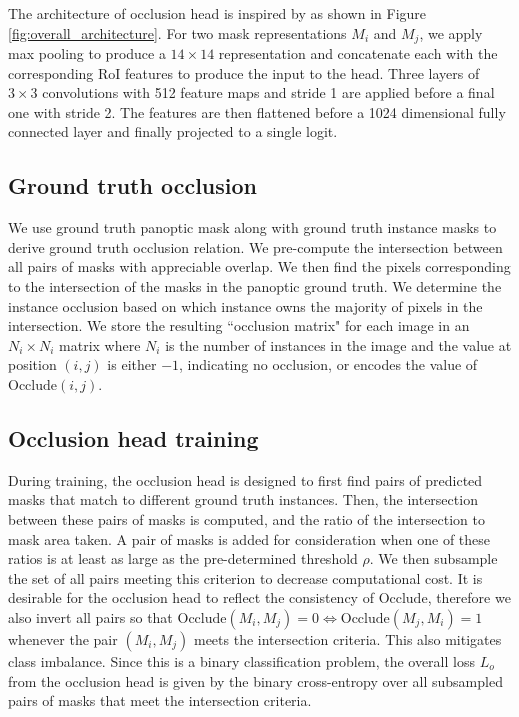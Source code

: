 \documentclass[10pt,twocolumn,letterpaper]{article}
\begin{document}
The architecture of occlusion head is inspired by \cite{huang2019mask} as shown in Figure \ref{fig:overall_architecture}. For two mask representations $M_i$ and $M_j$, we apply max pooling to produce a $14 \times 14$ representation and concatenate each with the corresponding RoI features to produce the input to the head. Three layers of $3 \times 3$ convolutions with 512 feature maps and stride 1 are applied before a final one with stride 2. The features are then flattened before a 1024 dimensional fully connected layer and finally projected to a single logit.


\subsection{Ground truth occlusion} \label{sec:gt_occlusion}

We use ground truth panoptic mask along with ground truth instance masks to derive ground truth occlusion relation. We pre-compute the intersection between all pairs of masks with appreciable overlap. We then find the pixels corresponding to the intersection of the masks in the panoptic ground truth. We determine the instance occlusion based on which instance owns the majority of pixels in the intersection. We store the resulting ``occlusion matrix" for each image in an $N_i \times N_i$ matrix where $N_i$ is the number of instances in the image and the value at position $(i, j)$ is either $-1$, indicating no occlusion, or encodes the value of $\text{Occlude}(i, j)$.

\subsection{Occlusion head training}

During training, the occlusion head is designed to first find pairs of predicted masks that match to different ground truth instances. Then, the intersection between these pairs of masks is computed, and the ratio of the intersection to mask area taken. A pair of masks is added for consideration when one of these ratios is at least as large as the pre-determined threshold $\rho$. We then subsample the set of all pairs meeting this criterion to decrease computational cost. It is desirable for the occlusion head to reflect the consistency of $\text{Occlude}$, therefore we also invert all pairs so that $\text{Occlude}(M_i, M_j) = 0 \iff \text{Occlude}(M_j, M_i) = 1$ whenever the pair $(M_i, M_j)$ meets the intersection criteria. This also mitigates class imbalance. Since this is a binary classification problem, the overall loss $L_o$ from the occlusion head is given by the binary cross-entropy over all subsampled pairs of masks that meet the intersection criteria.
\end{document}
